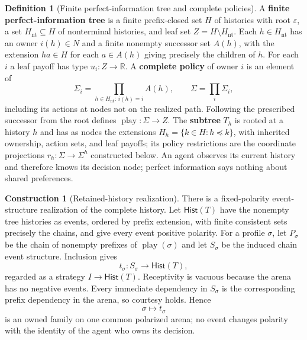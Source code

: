 \documentclass[11pt,a4paper]{article}
\numberwithin{equation}{section}
\theoremstyle{definition}
\newtheorem{definition}[theorem]{Definition}
\newtheorem{construction}[construction]{Construction}
\theoremstyle{remark}
\theoremstyle{plain}
\begin{document}
\begin{definition}[Finite perfect-information tree and complete policies]
\label{def:egt-finite-perfect-information-tree-and-complete-policies}
A \textbf{finite perfect-information tree} is a finite prefix-closed
set $H$ of histories with root $\varepsilon$, a set
$H_{\mathrm{nt}}\subseteq H$ of nonterminal histories, and leaf set
$Z=H\setminus H_{\mathrm{nt}}$. Each $h\in H_{\mathrm{nt}}$ has an
owner $i(h)\in N$ and a finite nonempty successor set $A(h)$, with
the extension $ha\in H$ for each $a\in A(h)$ giving precisely the
children of $h$. For each $i$ a leaf payoff has type
$u_i:Z\to\mathbb R$.
A \textbf{complete policy} of owner $i$ is an element of
\[
 \Sigma_i=\prod_{h\in H_{\mathrm{nt}}:\,i(h)=i}A(h),
 \qquad \Sigma=\prod_i\Sigma_i,
\]
including its actions at nodes not on the realized path. Following the
prescribed successor from the root defines
$\operatorname{play}:\Sigma\to Z$. The \textbf{subtree} $T_h$ is
rooted at a history $h$ and has as nodes the extensions
$H_h=\{k\in H:h\preceq k\}$, with inherited ownership, action sets,
and leaf payoffs; its policy restrictions are the coordinate projections
$r_h:\Sigma\to\Sigma^h$ constructed below. An agent observes its
current history and therefore knows its decision node; perfect
information says nothing about shared preferences.
\end{definition}
\begin{construction}[Retained-history realization]
There is a fixed-polarity event-structure realization of the complete
history. Let $\mathsf{Hist}(T)$ have the nonempty tree histories as events,
ordered by prefix extension, with finite consistent sets precisely the
chains, and give every event positive polarity. For a profile $\sigma$,
let $P_\sigma$ be the chain of nonempty prefixes of
$\operatorname{play}(\sigma)$ and let $S_\sigma$ be the induced chain event
structure. Inclusion gives
\[
 t_\sigma:S_\sigma\longrightarrow\mathsf{Hist}(T),
\]
regarded as a strategy $I\to\mathsf{Hist}(T)$. Receptivity is vacuous
because the arena has no negative events. Every immediate dependency in
$S_\sigma$ is the corresponding prefix dependency in the arena, so
courtesy holds. Hence
\[
 \sigma\longmapsto t_\sigma
\]
is an owned family on one common polarized arena; no event changes
polarity with the identity of the agent who owns its decision.
\end{construction}
\end{document}
